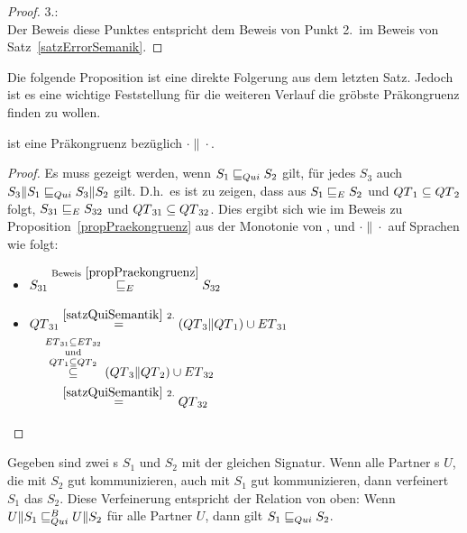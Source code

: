 \begin{proof}
  3.:\\
  Der Beweis diese Punktes entspricht dem Beweis von Punkt 2.\ im Beweis von
  Satz~\ref{satzErrorSemanik}.
\end{proof}

Die folgende Proposition ist eine direkte Folgerung aus dem letzten Satz.
Jedoch ist es eine wichtige Feststellung für die weiteren Verlauf die gröbste
Präkongruenz finden zu wollen.

\begin{prop}[Präkongruenz]
  \label{propQuiPrae}
  \QRel{} ist eine Präkongruenz bezüglich $\cdot\|\cdot$.
\end{prop}

\begin{proof}
  Es muss gezeigt werden, wenn $S_1\sqsubseteq _{Qui} S_2$ gilt, für jedes $S_3$ auch
  $S_3\|S_1\sqsubseteq _{Qui} S_3\|S_2$ gilt. D.h.\ es ist zu zeigen, dass aus $S_1\sqsubseteq _E
  S_2$ und $QT{}_1\subseteq QT{}_2$ folgt, $S_{31}\sqsubseteq _E S_{32}$ und
  $QT{}_{31}\subseteq QT{}_{32}$. Dies ergibt sich wie im Beweis zu
  Proposition~\ref{propPraekongruenz} aus der Monotonie von \cont{}, \prune{}
  und $\cdot\|\cdot$ auf Sprachen wie folgt:
  \begin{itemize}
    \item $\begin{aligned}[t]
        S_{31} \overset{\mathrm{Beweis}~\ref{propPraekongruenz}}{\sqsubseteq _E} S_{32}
    \end{aligned}$
    \item $\begin{aligned}[t]
        \QT{}_{31} &\overset{\ref{satzQuiSemantik}~2.}{=}
        (\QT{}_3\|\QT{}_1)\cup \ET{}_{31}\\
        &\hspace{-0.5cm}\overset{\ET{}_{31}\subseteq
      \ET{}_{32}}{\overset{\mathrm{und}}{\overset{\QT{}_1\subseteq
      \QT{}_2}{\subseteq}}} (\QT{}_3\|\QT{}_2) \cup \ET{}_{32}\\
        &\overset{\ref{satzQuiSemantik}~2.}{=} \QT{}_{32}
    \end{aligned}$
  \end{itemize}
\end{proof}

\begin{lem}
  \label{lemQuiVerfeinerung}
  Gegeben sind zwei \EIO{}s $S_1$ und $S_2$ mit der gleichen Signatur. Wenn
  alle Partner \EIO{}s $U$, die mit $S_2$  gut kommunizieren, auch mit $S_1$
  gut kommunizieren, dann verfeinert $S_1$ das \EIO{} $S_2$. Diese Verfeinerung
  entspricht der Relation \QRel{} von oben: Wenn $U\|S_1\sqsubseteq _{Qui}^B U\|S_2$ für alle
  Partner $U$, dann gilt $S_1\sqsubseteq _{Qui} S_2$.
\end{lem}

